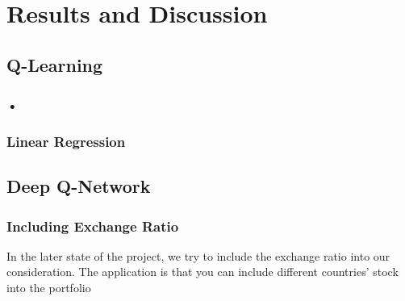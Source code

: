 \chapter{Results and Discussion}
\label{Ch:GivingCredit}

\section{Q-Learning}

\subsection{•}

\subsection{Linear Regression}

\section{Deep Q-Network}

\subsection{Including Exchange Ratio}
In the later state of the project, we try to include the exchange ratio into our consideration. The application is that you can include different countries' stock into the portfolio

\endinput
